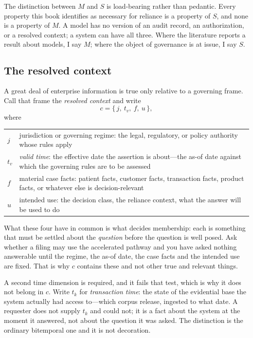 The distinction between $M$ and $S$ is load-bearing rather than pedantic. Every
property this book identifies as necessary for reliance is a property of $S$, and
none is a property of $M$. A model has no version of an audit record, an
authorization, or a resolved context; a system can have all three. Where the
literature reports a result about models, I say $M$; where the object of
governance is at issue, I say $S$.

\subsection{The resolved context}
\label{sec:resolved-context}

A great deal of enterprise information is true only relative to a governing frame.
Call that frame the \emph{resolved context} and write
\begin{equation}
  c = \{\, j,\ t_v,\ f,\ u \,\},
  \label{eq:context}
\end{equation}
where

\begin{center}
\begin{tabular}{@{}l>{\raggedright\arraybackslash}p{10.6cm}@{}}
\toprule
$j$ & jurisdiction or governing regime: the legal, regulatory, or policy authority
      whose rules apply \\
$t_v$ & \emph{valid time}: the effective date the assertion is about---the as-of date
      against which the governing rules are to be assessed \\
$f$ & material case facts: patient facts, customer facts, transaction facts,
      product facts, or whatever else is decision-relevant \\
$u$ & intended use: the decision class, the reliance context, what the answer will
      be used to do \\
\bottomrule
\end{tabular}
\end{center}

What these four have in common is what decides membership: each is something that
must be settled about the \emph{question} before the question is well posed. Ask
whether a filing may use the accelerated pathway and you have asked nothing
answerable until the regime, the as-of date, the case facts and the intended use are
fixed. That is why $c$ contains these and not other true and relevant things.

A second time dimension is required, and it fails that test, which is why it does not
belong in $c$. Write $t_k$ for \emph{transaction time}: the state of the evidential
base the system actually had access to---which corpus release, ingested to what date.
A requester does not supply $t_k$ and could not; it is a fact about the system at the
moment it answered, not about the question it was asked. The distinction is the
ordinary bitemporal one and it is not decoration.

